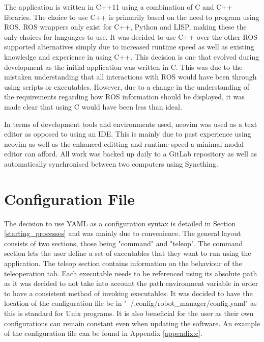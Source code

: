 The application is written in {\selectfont C++11} using a combination of {\selectfont C} and {\selectfont C++} libraries. The choice to use {\selectfont C++} is primarily based on the need to program using {\selectfont ROS}\cite{ros}. {\selectfont ROS} wrappers only exist for {\selectfont C++}, {\selectfont Python} and {\selectfont LISP}, making these the only choices for languages to use. It was decided to use {\selectfont C++} over the other {\selectfont ROS} supported alternatives simply due to increased runtime speed as well as existing knowledge and experience in using {\selectfont C++}. This decision is one that evolved during development as the initial application was written in {\selectfont C}. This was due to the mistaken understanding that all interactions with {\selectfont ROS} would have been through using scripts or executables. However, due to a change in the understanding of the requirements regarding how {\selectfont ROS} information should be displayed, it was made clear that using {\selectfont C} would have been less than ideal.

In terms of development tools and environments used, {\selectfont neovim}\cite{neovim} was used as a text editor as opposed to using an IDE. This is mainly due to past experience using {\selectfont neovim} as well as the enhanced editting and runtime speed a minimal modal editor can afford. All work was backed up daily to a {\selectfont GitLab} repository as well as automatically synchronised between two computers using {\selectfont Syncthing}\cite{syncthing}.

\section{Configuration File}

The decision to use {\selectfont YAML} as a configuration syntax is detailed in Section \ref{starting_processes} and was mainly due to convenience. The general layout consists of two sections, those being "command" and "teleop". The command section lets the user define a set of executables that they want to run using the application. The teleop section contains information on the behaviour of the teleoperation tab. Each executable needs to be referenced using its absolute path as it was decided to not take into account the path environment variable in order to have a consistent method of invoking executables. It was decided to have the location of the configuration file be in "~/.config/robot\_manager/config.yaml" as this is standard for Unix programs. It is also beneficial for the user as their own configurations can remain constant even when updating the software. An example of the configuration file can be found in Appendix \ref{appendix:c}.

